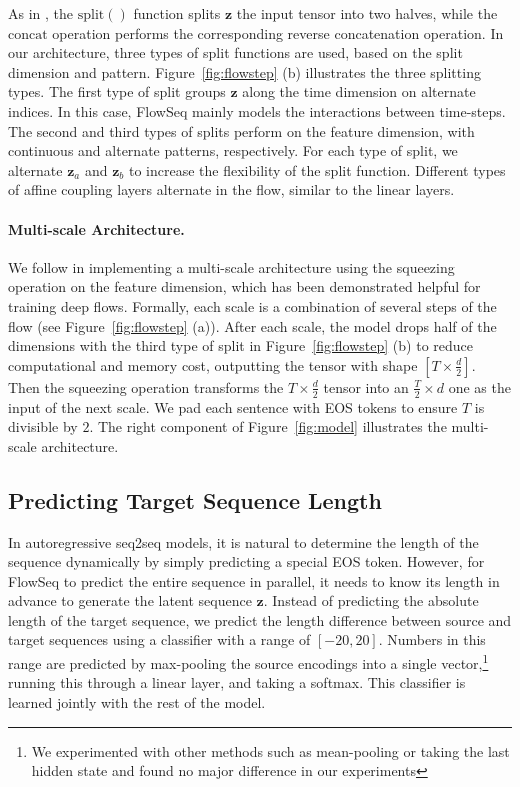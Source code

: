 \documentclass[11pt,a4paper]{article}
\newcommand{\zv}{\mathbf{z}}
\begin{document}
As in \citet{dinh2016density}, the $\mathrm{split}()$ function splits $\zv$ the input tensor into two halves, while the $\mathrm{concat}$ operation performs the corresponding reverse concatenation operation.
In our architecture, three types of split functions are used, based on the split dimension and pattern.
Figure~\ref{fig:flowstep} (b) illustrates the three splitting types.
The first type of split groups $\zv$ along the time dimension on alternate indices.
In this case, FlowSeq mainly models the interactions between time-steps.
The second and third types of splits perform on the feature dimension, with continuous and alternate patterns, respectively.
For each type of split, we alternate $\zv_a$ and $\zv_b$ to increase the flexibility of the split function.
Different types of affine coupling layers alternate in the flow, similar to the linear layers.

\paragraph{Multi-scale Architecture.}
We follow \citet{dinh2016density} in implementing a multi-scale architecture using the squeezing operation on the feature dimension, which has been demonstrated helpful for training deep flows. 
Formally, each scale is a combination of several steps of the flow (see Figure~\ref{fig:flowstep} (a)).
After each scale, the model drops half of the dimensions with the third type of split in Figure~\ref{fig:flowstep} (b) to reduce computational and memory cost, outputting the tensor with shape $[T \times \frac{d}{2}]$.
Then the squeezing operation transforms the $T \times \frac{d}{2}$ tensor into an $\frac{T}{2} \times d$ one as the input of the next scale. 
We pad each sentence with \textsf{EOS} tokens to ensure $T$ is divisible by $2$.
The right component of Figure~\ref{fig:model} illustrates the multi-scale architecture.

\subsection{Predicting Target Sequence Length}
\label{sec:len}
In autoregressive seq2seq models, it is natural to determine the length of the sequence dynamically by simply predicting a special \textsf{EOS} token.
However, for FlowSeq to predict the entire sequence in parallel, it needs to know its length in advance to generate the latent sequence $\zv$. 
Instead of predicting the absolute length of the target sequence, we predict the length difference between source and target sequences using a classifier with a range of $[-20, 20]$.
Numbers in this range are predicted by max-pooling the source encodings into a single vector,\footnote{We experimented with other methods such as mean-pooling or taking the last hidden state and found no major difference in our experiments}
running this through a linear layer, and taking a softmax.
This classifier is learned jointly with the rest of the model.
\end{document}
